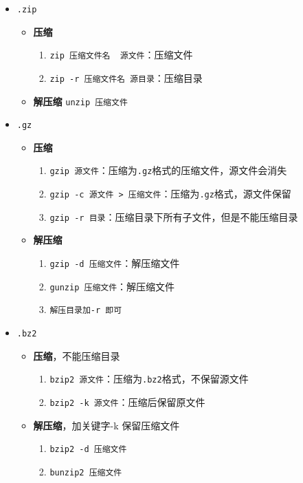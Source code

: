 \documentclass[UTF8,a4paper,12pt]{ctexbook}
\begin{document}
				\begin{itemize}
					\item  \verb|.zip|
						\begin{itemize}
							\item \textbf{压缩} 
								\begin{enumerate}
									\item \verb|zip 压缩文件名  源文件|：压缩文件
									\item \verb|zip -r 压缩文件名 源目录|：压缩目录
								\end{enumerate}
							\item \textbf{解压缩} \verb|unzip 压缩文件|
						\end{itemize}
					
					\item  \verb|.gz|
						\begin{itemize}
							\item \textbf{压缩}
								\begin{enumerate}
									\item \verb|gzip 源文件|：压缩为\verb|.gz|格式的压缩文件，源文件会消失
									\item \verb|gzip -c 源文件 > 压缩文件|：压缩为\verb|.gz|格式，源文件保留
									\item \verb|gzip -r 目录|：压缩目录下所有子文件，但是不能压缩目录
								\end{enumerate}
							\item \textbf{解压缩}
								\begin{enumerate}
									\item \verb|gzip -d 压缩文件|：解压缩文件
									\item \verb|gunzip 压缩文件|：解压缩文件
									\item \verb|解压目录加-r 即可|
								\end{enumerate}
						\end{itemize}
						
					\item  \verb|.bz2|
						\begin{itemize}
							\item \textbf{压缩}，不能压缩目录
								\begin{enumerate}
									\item \verb|bzip2 源文件|：压缩为\verb|.bz2|格式，不保留源文件
									\item \verb|bzip2 -k 源文件|：压缩后保留原文件
								\end{enumerate}
							\item \textbf{解压缩}，加关键字-k 保留压缩文件
								\begin{enumerate}
									\item \verb|bzip2 -d 压缩文件|
									\item \verb|bunzip2 压缩文件|
								\end{enumerate}
						\end{itemize}
					

\end{itemize}
\end{document}
